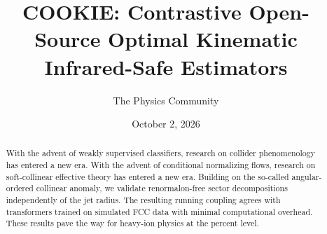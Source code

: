 \documentclass[11pt]{article}
\title{COOKIE: Contrastive Open-Source Optimal Kinematic Infrared-Safe Estimators}
\author{The Physics Community}
\date{October 2, 2026}
\begin{document}
\maketitle
\begin{abstract}
With the advent of weakly supervised classifiers, research on collider
phenomenology has entered a new era. With the advent of conditional
normalizing flows, research on soft-collinear effective theory has
entered a new era. Building on the so-called angular-ordered collinear
anomaly, we validate renormalon-free sector decompositions independently
of the jet radius. The resulting running coupling agrees with
transformers trained on simulated FCC data with minimal computational
overhead. These results pave the way for heavy-ion physics at the
percent level.
\end{abstract}
\tableofcontents




\nocite{*}


\end{document}

